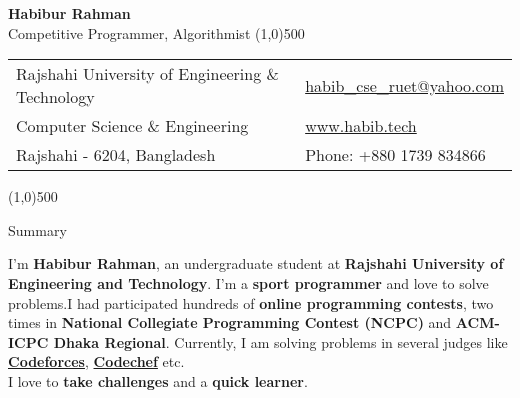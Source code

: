 \documentclass[letterpaper,11pt,oneside]{article}
\begin{document}
\center  \LARGE{\textbf{Habibur Rahman}} \\
\small{Competitive Programmer, Algorithmist}
\vspace{-4ex}
{\line(1,0){500}}
\normalsize
\begin{center}
\begin{tabular}{l l}
Rajshahi University of Engineering \& Technology    & \hspace{1.55in} \href{mailto:habib_cse_ruet@yahoo.com}{habib\_cse\_ruet@yahoo.com} \\
Computer Science \& Engineering    & \hspace{1.55in}  \href{www.habib.tech}{www.habib.tech}   \\        
Rajshahi - 6204, Bangladesh & \hspace{1.55in} Phone: +880 1739 834866 \\
\end{tabular}
\end{center}
\vspace{-2ex}
{\line(1,0){500}}
\vspace{-3ex}
\begin{flushleft}
\Large{Summary}
\end{flushleft}
\vspace{-1.85ex}
\begin{multicols}{2}
\justify
I'm \textbf{Habibur Rahman}, an undergraduate student at \textbf{Rajshahi University of Engineering and Technology}. I'm a \textbf{sport programmer} and love to solve problems.I had participated hundreds of \textbf{online programming contests}, two times in \textbf{National Collegiate Programming Contest (NCPC)} and \textbf{ACM-ICPC Dhaka Regional}. Currently, I am solving problems in several judges like \href{http://codeforces.com/profile/habib_rahman}{\textbf{Codeforces}}, \href{https://www.codechef.com/users/habib_ruet}{\textbf{Codechef}} etc.\\
I love to \textbf{take challenges} and a \textbf{quick learner}.
\end{multicols}
\vspace{1ex}
\end{document}
